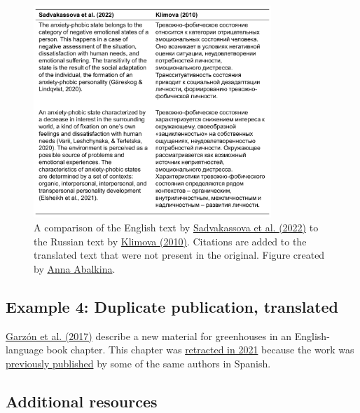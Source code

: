 \documentclass[letterpaper, 12pt]{article}
\begin{document}
\begin{figure}[h!tbp]
    \centering
    \includegraphics[width=0.8\textwidth]{img/plagiarism/sadvakassova_klimova.pdf}
    \caption*{A comparison of the English text by \href{https://doi.org/10.1111/mbe.12345}{Sadvakassova et al. (2022)} to the Russian text by \href{https://cyberleninka.ru/article/n/harakteristika-trevozhno-fobicheskogo-sostoyaniya-u-detey-doshkolnogo-vozrasta-s-zaderzhkoy-psihicheskogo-razvitiya-kak}{Klimova (2010)}. Citations are added to the translated text that were not present in the original. Figure created by \href{https://pubpeer.com/publications/A6C5007F7D6DF81B20F72098A04F20\#2}{Anna Abalkina}.}
\end{figure}

\subsection*{Example 4: Duplicate publication, translated}

\href{https://doi.org/10.1007/978-3-319-51859-6_14}{Garz\'on et al. (2017)} describe a new material for greenhouses in an English-language book chapter. This chapter was \href{https://doi.org/10.1007/978-3-319-51859-6_20}{retracted in 2021} because the work was \href{https://ingenieriacivil.cedex.es/index.php/ingenieria-civil/article/view/521}{previously published} by some of the same authors in Spanish.

\pagebreak

\subsection*{Additional resources}
\end{document}
